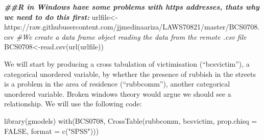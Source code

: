 \documentclass[
]{book}
\newenvironment{Shaded}{\begin{snugshade}}{\end{snugshade}}
\newcommand{\AttributeTok}[1]{\textcolor[rgb]{0.77,0.63,0.00}{#1}}
\newcommand{\CommentTok}[1]{\textcolor[rgb]{0.56,0.35,0.01}{\textit{#1}}}
\newcommand{\ConstantTok}[1]{\textcolor[rgb]{0.00,0.00,0.00}{#1}}
\newcommand{\DocumentationTok}[1]{\textcolor[rgb]{0.56,0.35,0.01}{\textbf{\textit{#1}}}}
\newcommand{\FunctionTok}[1]{\textcolor[rgb]{0.00,0.00,0.00}{#1}}
\newcommand{\NormalTok}[1]{#1}
\newcommand{\OtherTok}[1]{\textcolor[rgb]{0.56,0.35,0.01}{#1}}
\newcommand{\StringTok}[1]{\textcolor[rgb]{0.31,0.60,0.02}{#1}}
\begin{document}
\begin{Shaded}
\begin{Highlighting}[]
\DocumentationTok{\#\#R in Windows have some problems with https addresses, that\textquotesingle{}s why we need to do this first:}
\NormalTok{urlfile}\OtherTok{\textless{}{-}}\StringTok{\textquotesingle{}https://raw.githubusercontent.com/jjmedinaariza/LAWS70821/master/BCS0708.csv\textquotesingle{}}
\CommentTok{\#We create a data frame object reading the data from the remote .csv file}
\NormalTok{BCS0708}\OtherTok{\textless{}{-}}\FunctionTok{read.csv}\NormalTok{(}\FunctionTok{url}\NormalTok{(urlfile))}
\end{Highlighting}
\end{Shaded}

We will start by producing a cross tabulation of victimisation (``bcsvictim''), a categorical unordered variable, by whether the presence of rubbish in the streets is a problem in the area of residence (``rubbcomm''), another categorical unordered variable. Broken windows theory would argue we should see a relationship. We will use the following code:

\begin{Shaded}
\begin{Highlighting}[]
\FunctionTok{library}\NormalTok{(gmodels)}
\FunctionTok{with}\NormalTok{(BCS0708, }\FunctionTok{CrossTable}\NormalTok{(rubbcomm, bcsvictim, }\AttributeTok{prop.chisq =} \ConstantTok{FALSE}\NormalTok{, }\AttributeTok{format =} \FunctionTok{c}\NormalTok{(}\StringTok{"SPSS"}\NormalTok{)))}
\end{Highlighting}
\end{Shaded}
\end{document}
